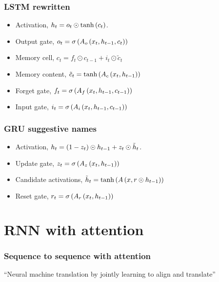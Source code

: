 \documentclass{beamer}
\begin{document}
\frame
{
   \frametitle{LSTM rewritten}

   \begin{itemize}
      \item<1-> Activation, $h_t = o_t \odot \tanh \left({c_t}\right)$.
      
      \item<2-> Output gate, $o_t = \sigma \left({A_o \left({x_t, h_{t-1}, c_t}\right)}\right)$

      \item<3-> Memory cell, $c_t = f_t \odot c_{t-1} + i_t \odot \tilde c_t$

      \item<4-> Memory content, $\tilde c_t = \tanh \left({A_c \left({x_t, h_{t-1}}\right)}\right)$

      \item<5-> Forget gate, $f_t = \sigma \left({ A_f \left({x_t, h_{t-1}, c_{t-1}}\right)}\right)$

      \item<6-> Input gate, $i_t = \sigma \left({ A_i \left({x_t, h_{t-1}, c_{t-1}}\right)}\right)$

   \end{itemize}
}

\frame
{
   \frametitle{GRU suggestive names}

   \begin{itemize}
      \item<1-> Activation, $h_t = \left({1 - z_t}\right) \odot h_{t-1} + z_t \odot \tilde h_t$.
      
      \item<2-> Update gate, $z_t = \sigma \left({A_z \left({x_t, h_{t-1}}\right)}\right)$

      \item<3-> Candidate activations, $\tilde h_t = \tanh \left({A \left({x, r \odot h_{t-1}}\right)}\right)$

      \item<4-> Reset gate, $r_t = \sigma \left({A_r \left({x_t, h_{t-1}}\right)}\right)$

   \end{itemize}
}

\section{RNN with attention}

\frame
{
   \frametitle{Sequence to sequence with attention}


   ``Neural machine translation by jointly learning to align and translate'' \cite{bahdanau2014neural}
}
\end{document}

